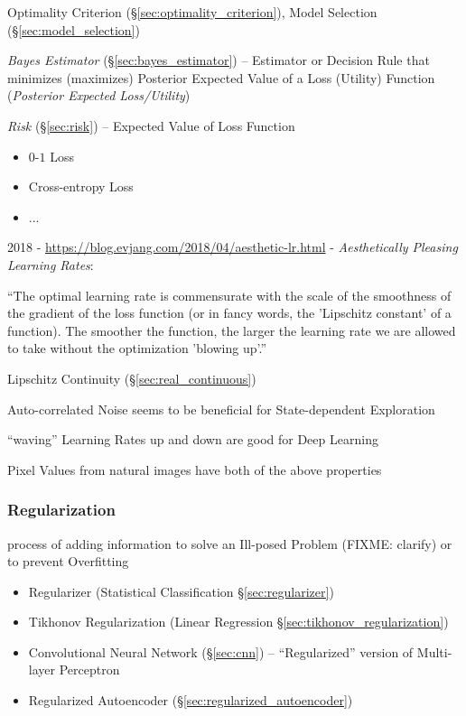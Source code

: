 \fist Optimality Criterion (\S\ref{sec:optimality_criterion}), Model Selection
(\S\ref{sec:model_selection})

\fist \emph{Bayes Estimator} (\S\ref{sec:bayes_estimator}) -- Estimator or
Decision Rule that minimizes (maximizes) Posterior Expected Value of a Loss
(Utility) Function (\emph{Posterior Expected Loss/Utility})

\fist \emph{Risk} (\S\ref{sec:risk}) -- Expected Value of Loss Function

\begin{itemize}
  \item $0$-$1$ Loss
  \item Cross-entropy Loss
  \item ...
\end{itemize}

2018 - \url{https://blog.evjang.com/2018/04/aesthetic-lr.html} - \emph{Aesthetically
  Pleasing Learning Rates}:

``The optimal learning rate is commensurate with the scale of the smoothness of
the gradient of the loss function (or in fancy words, the 'Lipschitz constant'
of a function). The smoother the function, the larger the learning rate we are
allowed to take without the optimization 'blowing up'.''

\fist Lipschitz Continuity (\S\ref{sec:real_continuous})

Auto-correlated Noise seems to be beneficial for State-dependent Exploration

``waving'' Learning Rates up and down are good for Deep Learning

Pixel Values from natural images have both of the above properties



\subsubsection{Regularization}\label{sec:regularization}

process of adding information to solve an Ill-posed Problem (FIXME: clarify) or
to prevent Overfitting

\begin{itemize}
  \item Regularizer (Statistical Classification \S\ref{sec:regularizer})
  \item Tikhonov Regularization (Linear Regression
    \S\ref{sec:tikhonov_regularization})
  \item Convolutional Neural Network (\S\ref{sec:cnn}) -- ``Regularized''
    version of Multi-layer Perceptron
  \item Regularized Autoencoder (\S\ref{sec:regularized_autoencoder})
\end{itemize}

